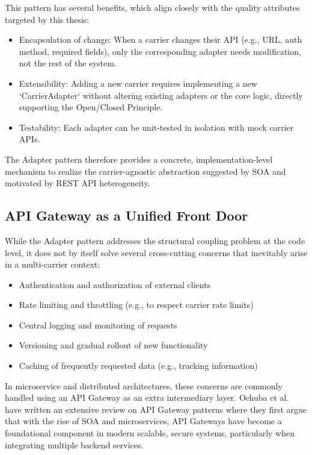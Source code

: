 \documentclass{imc-inf}
\begin{document}
This pattern has several benefits, which align closely with the quality attributes targeted by this thesis:

\begin{itemize}[itemsep=3pt]
  \item Encapsulation of change: When a carrier changes their API (e.g., URL, auth method, required fields), only the corresponding adapter needs modification, not the rest of the system.
  \item Extensibility: Adding a new carrier requires implementing a new `CarrierAdapter` without altering existing adapters or the core logic, directly supporting the Open/Closed Principle.
  \item Testability: Each adapter can be unit-tested in isolation with mock carrier APIs.
\end{itemize}

The Adapter pattern therefore provides a concrete, implementation-level mechanism to realize the carrier-agnostic abstraction suggested by SOA and motivated by REST API heterogeneity.

\subsection{API Gateway as a Unified Front Door}

While the Adapter pattern addresses the structural coupling problem at the code level, it does not by itself solve several cross-cutting concerns that inevitably arise in a multi-carrier context:

\begin{itemize}[itemsep=3pt]
  \item Authentication and authorization of external clients
  \item Rate limiting and throttling (e.g., to respect carrier rate limits)
  \item Central logging and monitoring of requests
  \item Versioning and gradual rollout of new functionality
  \item Caching of frequently requested data (e.g., tracking information)
\end{itemize}

In microservice and distributed architectures, these concerns are commonly handled using an API Gateway as an extra intermediary layer.
Ochuba et al. have written an extensive review on API Gateway patterns \cite{ochubaSystematicReviewAPI2021} where they first argue that with the rise of SOA and microservices, API Gateways have become a foundational component in modern scalable, secure systems, particularly when integrating multiple backend services.
\end{document}
